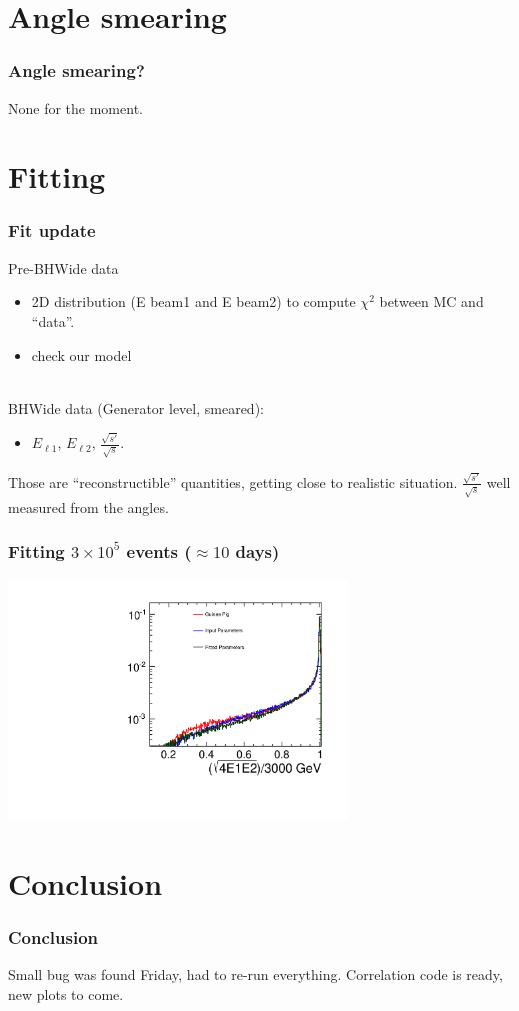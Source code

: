 \documentclass{beamer}
\begin{document}
\section{Angle smearing}
\begin{frame}
\frametitle{Angle smearing?}
None for the moment.
\end{frame}
\section{Fitting}
\begin{frame}
\frametitle{Fit update}
Pre-BHWide data 
\begin{itemize}
  \item 2D distribution (E beam1 and E beam2) to compute $\chi^2$
between MC and ``data''.
\item check our model
\end{itemize}
~\\
BHWide data (Generator level, smeared):
\begin{itemize}
  \item $E_{\ell1}$, $E_{\ell2}$, $\frac{\sqrt{s'}}{\sqrt{s}}$.
\end{itemize}
Those are ``reconstructible'' quantities, getting close to realistic situation.
$\frac{\sqrt{s'}}{\sqrt{s}}$ well measured from the angles.
\end{frame}
\begin{frame}
\frametitle{Fitting $3\times 10^5$ events ($\approx10$ days)}
\begin{center}
\includegraphics[width=9cm,page=2]{final_res}
\end{center}
\end{frame}
\section{Conclusion}
\begin{frame}
\frametitle{Conclusion}
Small bug was found Friday, had to re-run everything. Correlation code is ready,
new plots to come.
\end{frame}
\end{document}
